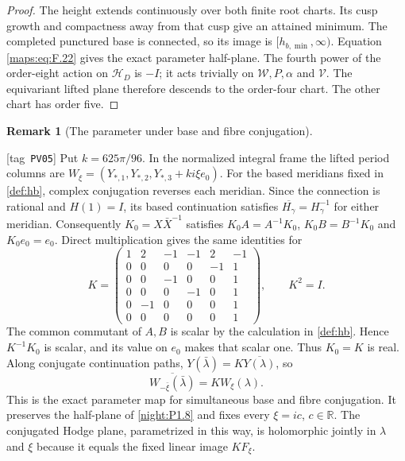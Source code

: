 \documentclass[11pt,a4paper]{article}
\numberwithin{equation}{section}
\theoremstyle{definition}
\newtheorem{remark}[remark]{Remark}
\newcommand{\StatementRecord}[4]{{\upshape\footnotesize[tag~\texttt{#3}]}\enspace\ignorespaces}
\begin{document}
\begin{proof}
The height extends continuously over both finite root charts.
Its cusp growth and compactness away from that cusp give an
attained minimum. The completed punctured base is connected, so
its image is $[h_{b,\min},\infty)$. Equation
\eqref{maps:eq:F.22} gives the exact parameter half-plane.
The fourth power of the order-eight action on $\mathcal H_D$
is $-I$; it acts trivially on $\mathcal W,P,\alpha$ and
$\mathcal V$. The equivariant lifted plane therefore descends
to the order-four chart. The other chart has order five.
\end{proof}












\begin{remark}[The parameter under base and fibre conjugation]
\hypertarget{tag-PV05}{}\label{rem:V:conjugation-parameter}
\StatementRecord{rem:V:conjugation-parameter}{proved}{PV05}{}
Put $k=625\pi/96$. In the normalized integral frame the lifted
period columns are
$W_\xi=(Y_{*,1},Y_{*,2},Y_{*,3}+ki\xi e_0)$.
For the based meridians fixed in \cref{def:hb}, complex conjugation
reverses each meridian. Since the connection is rational and
$H(1)=I$, its based continuation satisfies
$\overline{H_\gamma}=H_\gamma^{-1}$ for either meridian.
Consequently $K_0=X\bar X^{-1}$ satisfies
$K_0A=A^{-1}K_0$, $K_0B=B^{-1}K_0$ and $K_0e_0=e_0$.
Direct multiplication gives the same identities for
\[
 K=\begin{pmatrix}
 1&2&-1&-1&2&-1\\
 0&0&0&0&-1&1\\
 0&0&-1&0&0&1\\
 0&0&0&-1&0&1\\
 0&-1&0&0&0&1\\
 0&0&0&0&0&1
 \end{pmatrix},\qquad K^2=I.
\]
The common commutant of $A,B$ is scalar by the calculation in
\cref{def:hb}. Hence $K^{-1}K_0$ is scalar, and its value on
$e_0$ makes that scalar one. Thus $K_0=K$ is real.
Along conjugate continuation paths,
$Y(\bar\lambda)=K\overline{Y(\lambda)}$, so
\[
 \overline{W_{-\bar\xi}(\bar\lambda)}=K W_\xi(\lambda).
\]
This is the exact parameter map for simultaneous base and fibre
conjugation. It preserves the half-plane of \cref{night:P1.8}
and fixes every $\xi=ic$, $c\in\mathbb R$. The conjugated
Hodge plane, parametrized in this way, is holomorphic jointly
in $\lambda$ and $\xi$ because it equals the fixed linear
image $K F_\xi$.
\end{remark}
\end{document}
